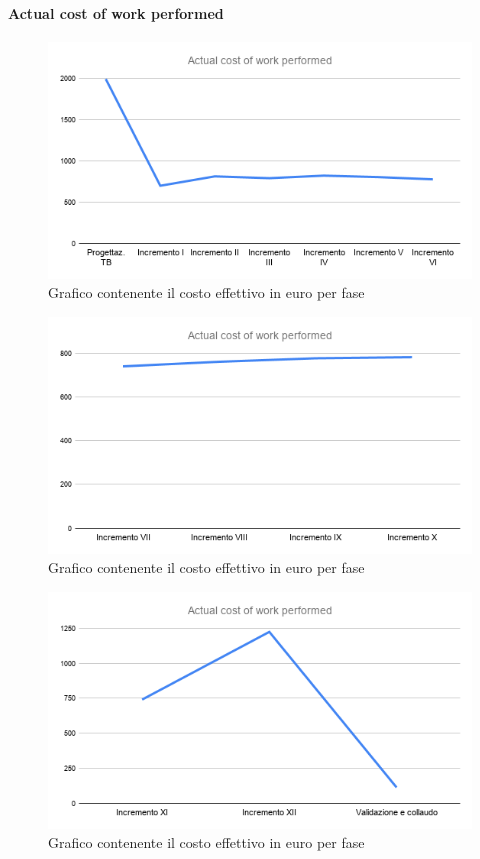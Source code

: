 	\paragraph{Actual cost of work performed}
		\begin{figure}[H]
			\centering
			\includegraphics[width=0.8\linewidth]{./res/images/ACWP_1.png}
			\caption{Grafico contenente il costo effettivo in euro per fase}
			\label{fig:Grafico contenente il costo effettivo in euro per fase}
		\end{figure}
		\begin{figure}[H]
			\centering
			\includegraphics[width=0.8\linewidth]{./res/images/ACWP_2.png}
			\caption{Grafico contenente il costo effettivo in euro per fase}
			\label{fig:Grafico contenente il costo effettivo in euro per fase}
		\end{figure}
		\begin{figure}[H]
			\centering
			\includegraphics[width=0.8\linewidth]{./res/images/ACWP_3.png}
			\caption{Grafico contenente il costo effettivo in euro per fase}
			\label{fig:Grafico contenente il costo effettivo in euro per fase}
		\end{figure}

